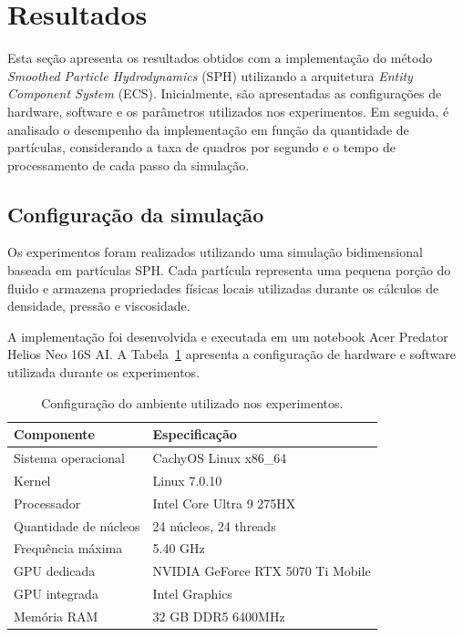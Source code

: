 \section{Resultados}
\label{sec:resultados}


Esta seção apresenta os resultados obtidos com a implementação do método
\textit{Smoothed Particle Hydrodynamics} (SPH) utilizando a arquitetura
\textit{Entity Component System} (ECS). Inicialmente, são apresentadas as
configurações de hardware, software e os parâmetros utilizados nos
experimentos. Em seguida, é analisado o desempenho da implementação em função
da quantidade de partículas, considerando a taxa de quadros por segundo e o
tempo de processamento de cada passo da simulação.

\subsection{Configuração da simulação}
\label{subsec:simulation_setup}

Os experimentos foram realizados utilizando uma simulação bidimensional baseada
em partículas SPH. Cada partícula representa uma pequena porção do fluido e
armazena propriedades físicas locais utilizadas durante os cálculos de
densidade, pressão e viscosidade.

A implementação foi desenvolvida e executada em um notebook Acer Predator
Helios Neo 16S AI. A Tabela~\ref{tab:hardware_specs} apresenta a configuração
de hardware e software utilizada durante os experimentos.

\begin{table}[H]
\centering
\caption{Configuração do ambiente utilizado nos experimentos.}
\label{tab:hardware_specs}
\begin{tabular}{l l}
\hline
Componente & Especificação \\
\hline
Sistema operacional & CachyOS Linux x86\_64 \\
Kernel & Linux 7.0.10 \\
Processador & Intel Core Ultra 9 275HX \\
Quantidade de núcleos & 24 núcleos, 24 threads \\
Frequência máxima & 5.40 GHz \\
GPU dedicada & NVIDIA GeForce RTX 5070 Ti Mobile \\
GPU integrada & Intel Graphics \\
Memória RAM & 32 GB DDR5 6400MHz \\
\hline
\end{tabular}
\end{table}

